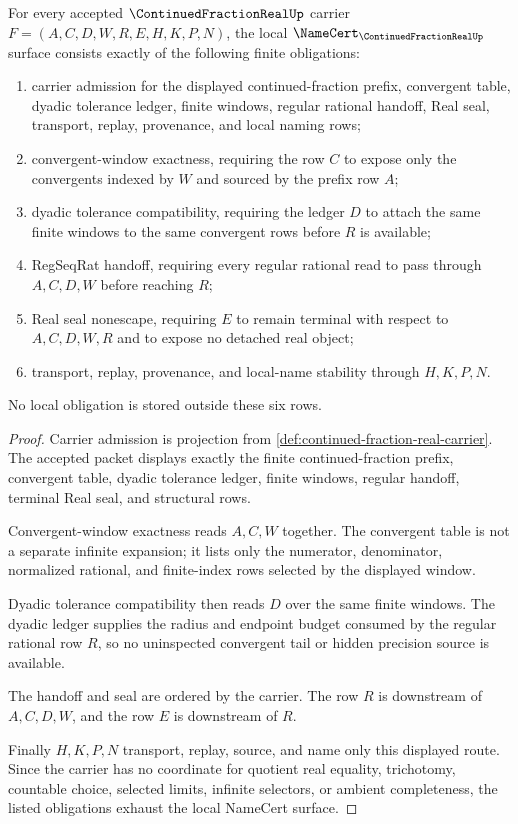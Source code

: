 \begin{theorem}
\label{thm:continued-fraction-real-namecert-obligations}
For every accepted $\ContinuedFractionRealUp$ carrier $F=(A,C,D,W,R,E,H,K,P,N)$, the local $\NameCert_{\ContinuedFractionRealUp}$ surface consists exactly of the following finite obligations:
\begin{enumerate}
\item carrier admission for the displayed continued-fraction prefix, convergent table, dyadic tolerance ledger, finite windows, regular rational handoff, Real seal, transport, replay, provenance, and local naming rows;
\item convergent-window exactness, requiring the row $C$ to expose only the convergents indexed by $W$ and sourced by the prefix row $A$;
\item dyadic tolerance compatibility, requiring the ledger $D$ to attach the same finite windows to the same convergent rows before $R$ is available;
\item RegSeqRat handoff, requiring every regular rational read to pass through $A,C,D,W$ before reaching $R$;
\item Real seal nonescape, requiring $E$ to remain terminal with respect to $A,C,D,W,R$ and to expose no detached real object;
\item transport, replay, provenance, and local-name stability through $H,K,P,N$.
\end{enumerate}
No local obligation is stored outside these six rows.
\end{theorem}
\begin{proof}
Carrier admission is projection from \autoref{def:continued-fraction-real-carrier}. The accepted packet displays exactly the finite continued-fraction prefix, convergent table, dyadic tolerance ledger, finite windows, regular handoff, terminal Real seal, and structural rows.

Convergent-window exactness reads $A,C,W$ together. The convergent table is not a separate infinite expansion; it lists only the numerator, denominator, normalized rational, and finite-index rows selected by the displayed window.

Dyadic tolerance compatibility then reads $D$ over the same finite windows. The dyadic ledger supplies the radius and endpoint budget consumed by the regular rational row $R$, so no uninspected convergent tail or hidden precision source is available.

The handoff and seal are ordered by the carrier. The row $R$ is downstream of $A,C,D,W$, and the row $E$ is downstream of $R$.

Finally $H,K,P,N$ transport, replay, source, and name only this displayed route. Since the carrier has no coordinate for quotient real equality, trichotomy, countable choice, selected limits, infinite selectors, or ambient completeness, the listed obligations exhaust the local NameCert surface.
\end{proof}

